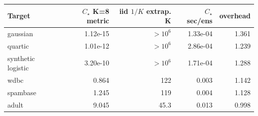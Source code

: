 \begin{tabular}{lrrrr}
\toprule
Target & $C_\star$ K=8 metric & iid $1/K$ extrap. K & $C_\star$ sec/ens & overhead \\
\midrule
gaussian & 1.12e-15 & $>10^6$ & 1.33e-04 & 1.361 \\
quartic & 1.01e-12 & $>10^6$ & 2.86e-04 & 1.239 \\
synthetic logistic & 3.20e-10 & $>10^6$ & 1.71e-04 & 1.288 \\
wdbc & 0.864 & 122 & 0.003 & 1.142 \\
spambase & 1.245 & 119 & 0.004 & 1.128 \\
adult & 9.045 & 45.3 & 0.013 & 0.998 \\
\bottomrule
\end{tabular}
